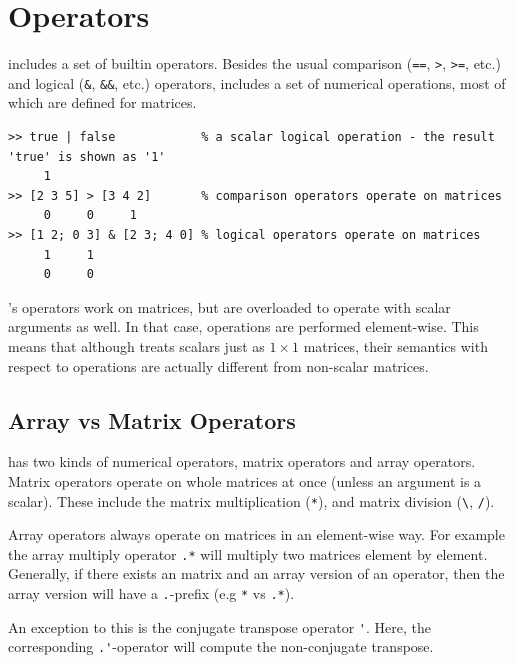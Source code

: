 \section{\matlab Operators}
\label{sec:operators}

\matlab includes a set of builtin operators. Besides the usual comparison 
(\lstinline{==}, \lstinline{>}, \lstinline{>=}, etc.) and logical
(\lstinline{&}, \lstinline{&&}, etc.) operators, \matlab includes a set of
numerical operations, most of which are defined for matrices.

\begin{lstlisting}
>> true | false            % a scalar logical operation - the result 'true' is shown as '1'
     1
>> [2 3 5] > [3 4 2]       % comparison operators operate on matrices
     0     0     1
>> [1 2; 0 3] & [2 3; 4 0] % logical operators operate on matrices
     1     1
     0     0
\end{lstlisting}

\matlab's 
operators work on matrices, but are overloaded to operate with scalar
arguments as well. In that case, operations are performed
element-wise.  This means that although \matlab treats scalars just as
$1 \times 1$ matrices, their semantics with respect to operations are
actually different from non-scalar matrices.

\subsection{Array vs Matrix Operators}
\label{sec:ArrayVsMatrix}

\matlab has two kinds of numerical operators, matrix operators and 
array operators. Matrix operators operate on whole matrices at once
(unless an argument is a scalar). These include the matrix multiplication (\lstinline{*}),
and matrix division (\lstinline{\}, \lstinline{/}).

Array operators always operate on matrices in an element-wise way. For example the 
array multiply operator {\tt .*} will multiply two matrices element by element.
Generally, if there exists an matrix and an array version of an operator, then the 
array version will have a \lstinline{.}-prefix (e.g \lstinline{*} vs \lstinline{.*}).

An exception to this is the conjugate transpose operator \lstinline{'}. Here, the corresponding
\lstinline{.'}-operator will compute the non-conjugate transpose.

